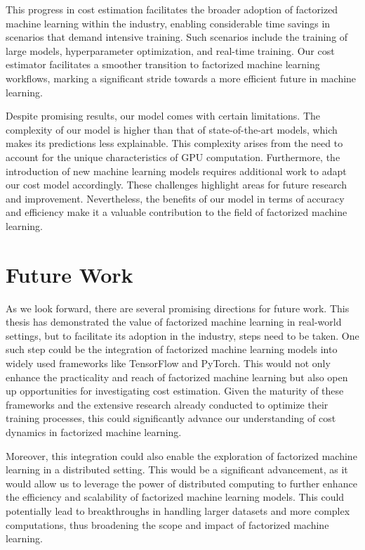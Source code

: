 This progress in cost estimation facilitates the broader adoption of factorized machine learning within the industry, enabling considerable time savings in scenarios that demand intensive training. Such scenarios include the training of large models, hyperparameter optimization, and real-time training. Our cost estimator facilitates a smoother transition to factorized machine learning workflows, marking a significant stride towards a more efficient future in machine learning.

Despite promising results, our model comes with certain limitations. The complexity of our model is higher than that of state-of-the-art models, which makes its predictions less explainable. This complexity arises from the need to account for the unique characteristics of GPU computation. Furthermore, the introduction of new machine learning models requires additional work to adapt our cost model accordingly. These challenges highlight areas for future research and improvement. Nevertheless, the benefits of our model in terms of accuracy and efficiency make it a valuable contribution to the field of factorized machine learning.

\section{Future Work}
\label{sec:7-future-work}
As we look forward, there are several promising directions for future work. This thesis has demonstrated the value of factorized machine learning in real-world settings, but to facilitate its adoption in the industry, steps need to be taken. One such step could be the integration of factorized machine learning models into widely used frameworks like TensorFlow and PyTorch. This would not only enhance the practicality and reach of factorized machine learning but also open up opportunities for investigating cost estimation. Given the maturity of these frameworks and the extensive research already conducted to optimize their training processes, this could significantly advance our understanding of cost dynamics in factorized machine learning.

Moreover, this integration could also enable the exploration of factorized machine learning in a distributed setting. This would be a significant advancement, as it would allow us to leverage the power of distributed computing to further enhance the efficiency and scalability of factorized machine learning models. This could potentially lead to breakthroughs in handling larger datasets and more complex computations, thus broadening the scope and impact of factorized machine learning.


